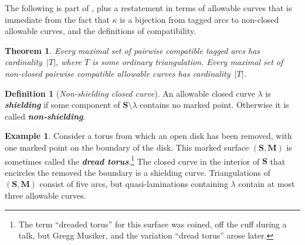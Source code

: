\documentclass{amsart}
\newtheorem{theorem}[proposition]{Theorem}
\theoremstyle{definition}
\newtheorem{example}[proposition]{Example}
\newtheorem{definition}[proposition]{Definition}
\theoremstyle{remark}
\numberwithin{equation}{section}
\newcommand{\newword}[1]{\textbf{\emph{#1}}}
\newcommand{\0}{{\mathbf{0}}}
\newcommand{\M}{\mathbf{M}}
\renewcommand{\S}{\mathbf{S}}
\begin{document}
The following is part of \cite[Theorem~7.9]{cats1}, plus a restatement in terms of allowable curves that is immediate from the fact that $\kappa$ is a bijection from tagged arcs to non-closed allowable curves, and the definitions of compatibility.

\begin{theorem}\label{card thm}
Every maximal set of pairwise compatible tagged arcs has cardinality~$|T|$, where $T$ is some ordinary triangulation.
Every maximal set of non-closed pairwise compatible allowable curves has cardinality~$|T|$.
\end{theorem}

\begin{definition}[\emph{Non-shielding closed curve}]\label{nonshield def}
An allowable closed curve $\lambda$ is \newword{shielding} if some component of $\S \setminus \lambda$ contains no marked point.
Otherwise it is called \newword{non-shielding}.
\end{definition}

\begin{example}\label{shield ex}
Consider a torus from which an open disk has been removed, with one marked point on the boundary of the disk.
This marked surface $(\S,\M)$ is sometimes called the \newword{dread torus}.\footnote{The term ``dreaded torus'' for this surface was coined, off the cuff during a talk, but Gregg Musiker, and the variation ``dread torus'' arose later.}
The closed curve in the interior of $\S$ that encircles the removed  the boundary is a shielding curve.
Triangulations of $(\S,\M)$ consist of five arcs, but quasi-laminations containing $\lambda$ contain at most three allowable curves. 
\end{example}
\end{document}
